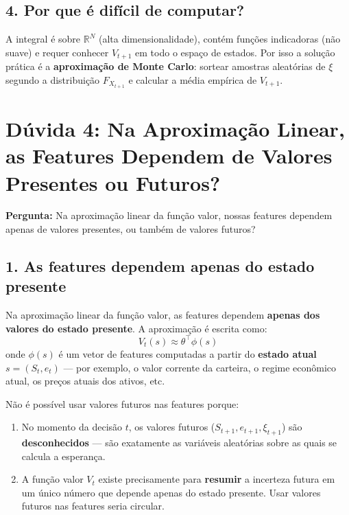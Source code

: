 \documentclass[12pt,a4paper]{article}
\begin{document}
\subsection{4. Por que é difícil de computar?}

A integral é sobre $\mathbb{R}^N$ (alta dimensionalidade), contém funções indicadoras (não suave) e requer conhecer $V_{t+1}$ em todo o espaço de estados. Por isso a solução prática é a \textbf{aproximação de Monte Carlo}: sortear amostras aleatórias de $\xi$ segundo a distribuição $F_{X_{t+1}}$ e calcular a média empírica de $V_{t+1}$.

\section{Dúvida 4: Na Aproximação Linear, as Features Dependem de Valores Presentes ou Futuros?}

\textbf{Pergunta:} Na aproximação linear da função valor, nossas features dependem apenas de valores presentes, ou também de valores futuros?

\subsection{1. As features dependem apenas do estado presente}

Na aproximação linear da função valor, as features dependem \textbf{apenas dos valores do estado presente}. A aproximação é escrita como:
\begin{equation}
    V_t(s) \approx \theta^\top \phi(s)
\end{equation}
onde $\phi(s)$ é um vetor de features computadas a partir do \textbf{estado atual} $s = (S_t, e_t)$ --- por exemplo, o valor corrente da carteira, o regime econômico atual, os preços atuais dos ativos, etc.

Não é possível usar valores futuros nas features porque:
\begin{enumerate}
    \item No momento da decisão $t$, os valores futuros ($S_{t+1}, e_{t+1}, \xi_{t+1}$) são \textbf{desconhecidos} --- são exatamente as variáveis aleatórias sobre as quais se calcula a esperança.
    \item A função valor $V_t$ existe precisamente para \textbf{resumir} a incerteza futura em um único número que depende apenas do estado presente. Usar valores futuros nas features seria circular.
\end{enumerate}
\end{document}
